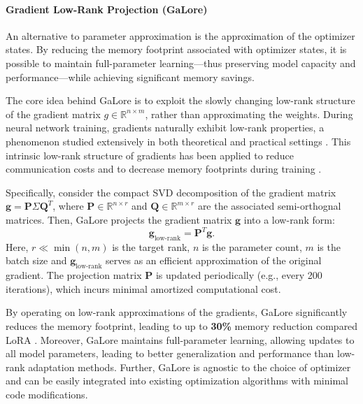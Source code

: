 \paragraph{Gradient Low-Rank Projection (GaLore)}

An alternative to parameter approximation is the approximation of the optimizer states. By reducing the memory footprint associated with optimizer states, it is possible to maintain full-parameter learning—thus preserving model capacity and performance—while achieving significant memory savings.

The core idea behind GaLore \citep{zhao2024galore} is to exploit the slowly changing low-rank structure of the gradient matrix $g \in \mathbb{R}^{n \times m}$, rather than approximating the weights. During neural network training, gradients naturally exhibit low-rank properties, a phenomenon studied extensively in both theoretical and practical settings \citep{zhaoZerOInitializationInitializing2022,cossonLowRankGradientDescent2023,yang2023spectral}. This intrinsic low-rank structure of gradients has been applied to reduce communication costs \citep{wangATOMOCommunicationefficientLearning,vogelsPowerGossipPracticalLowRank2020} and to decrease memory footprints during training \citep{gooneratneLowrankGradientApproximation2020,huangLowRankGradientDescent2023}.

Specifically, consider the compact SVD decomposition of the gradient matrix \(\mathbf{g} = \mathbf{P} \Sigma \mathbf{Q}^{T}\), where \(\mathbf{P} \in \mathbb{R}^{n \times r}\) and \(\mathbf{Q} \in \mathbb{R}^{m \times r}\) are the associated semi-orthognal matrices.  Then, GaLore projects the gradient matrix $\mathbf{g}$ into a low-rank form:
\begin{equation}
    \mathbf{g}_{\text{low-rank}} = \mathbf{P}^{T} \mathbf{g}.
\end{equation}
Here, $r \ll \min(n, m)$ is the target rank, \(n\) is the parameter count, \(m\) is the batch size and $\mathbf{g}_{\text{low-rank}}$ serves as an efficient approximation of the original gradient. The projection matrix $\mathbf{P}$ is updated periodically (e.g., every 200 iterations), which incurs minimal amortized computational cost.

By operating on low-rank approximations of the gradients, GaLore significantly reduces the memory footprint, leading to up to \textbf{30\%} memory reduction compared LoRA \citep{zhao2024galore}. Moreover, GaLore maintains full-parameter learning, allowing updates to all model parameters, leading to better generalization and performance than low-rank adaptation methods. Further, GaLore is agnostic to the choice of optimizer and can be easily integrated into existing optimization algorithms with minimal code modifications.

